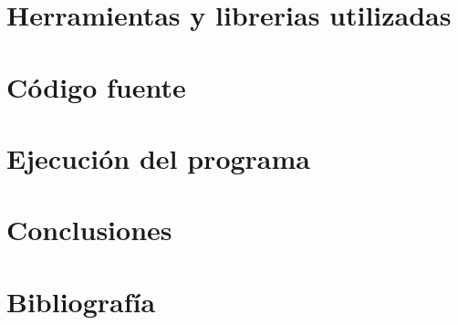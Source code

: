 \documentclass[12pt]{article}
\begin{document}
\section{Herramientas y librerias utilizadas}
\section{Código fuente}
\section{Ejecución del programa}
\section{Conclusiones}
\section{Bibliografía}
\end{document}
